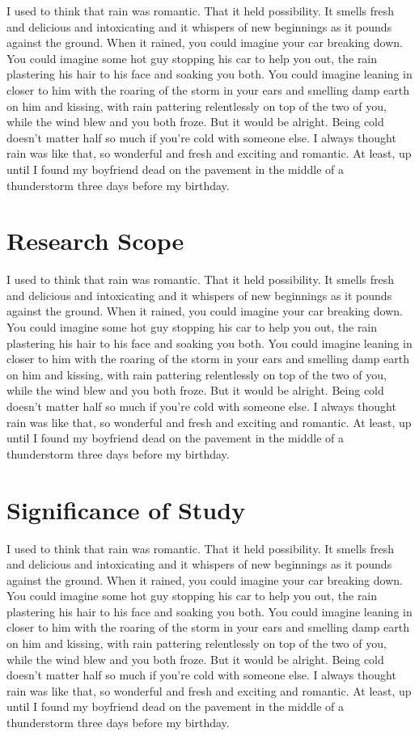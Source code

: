 I used to think that rain was romantic. That it held possibility. It smells fresh and delicious and intoxicating and it whispers of new beginnings as it pounds against the ground. When it rained, you could imagine your car breaking down. You could imagine some hot guy stopping his car to help you out, the rain plastering his hair to his face and soaking you both. You could imagine leaning in closer to him with the roaring of the storm in your ears and smelling damp earth on him and kissing, with rain pattering relentlessly on top of the two of you, while the wind blew and you both froze. But it would be alright. Being cold doesn't matter half so much if you're cold with someone else.
I always thought rain was like that, so wonderful and fresh and exciting and romantic.
At least, up until I found my boyfriend dead on the pavement in the middle of a thunderstorm three days before my birthday.

\section{Research Scope }

I used to think that rain was romantic. That it held possibility. It smells fresh and delicious and intoxicating and it whispers of new beginnings as it pounds against the ground. When it rained, you could imagine your car breaking down. You could imagine some hot guy stopping his car to help you out, the rain plastering his hair to his face and soaking you both. You could imagine leaning in closer to him with the roaring of the storm in your ears and smelling damp earth on him and kissing, with rain pattering relentlessly on top of the two of you, while the wind blew and you both froze. But it would be alright. Being cold doesn't matter half so much if you're cold with someone else.
I always thought rain was like that, so wonderful and fresh and exciting and romantic.
At least, up until I found my boyfriend dead on the pavement in the middle of a thunderstorm three days before my birthday.

\section{Significance of Study}
I used to think that rain was romantic. That it held possibility. It smells fresh and delicious and intoxicating and it whispers of new beginnings as it pounds against the ground. When it rained, you could imagine your car breaking down. You could imagine some hot guy stopping his car to help you out, the rain plastering his hair to his face and soaking you both. You could imagine leaning in closer to him with the roaring of the storm in your ears and smelling damp earth on him and kissing, with rain pattering relentlessly on top of the two of you, while the wind blew and you both froze. But it would be alright. Being cold doesn't matter half so much if you're cold with someone else.
I always thought rain was like that, so wonderful and fresh and exciting and romantic.
At least, up until I found my boyfriend dead on the pavement in the middle of a thunderstorm three days before my birthday.
